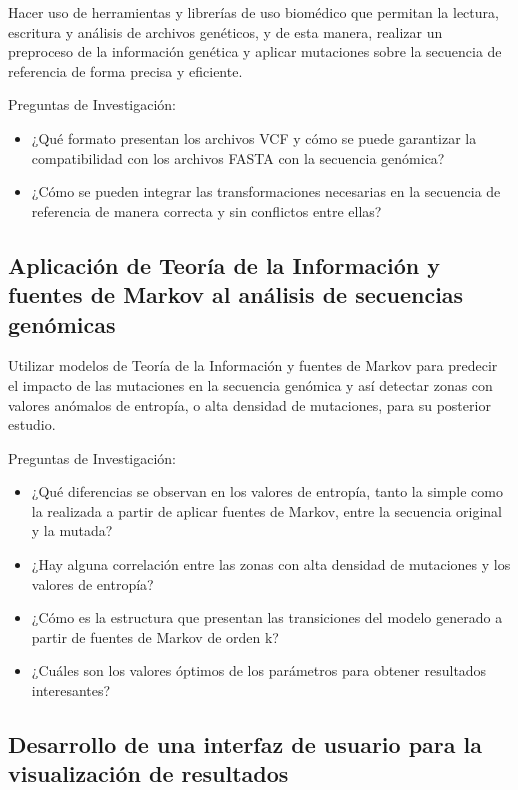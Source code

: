 \documentclass[11pt,spanish,listoffigures,listoftables]{tfgetsinf}
\begin{document}
Hacer uso de herramientas y librerías de uso biomédico que permitan la lectura, escritura y análisis de archivos genéticos, y de esta manera, realizar un preproceso de la información genética y aplicar mutaciones sobre la secuencia de referencia de forma precisa y eficiente.

Preguntas de Investigación: 
\begin{itemize}
\item ¿Qué formato presentan los archivos \acs{VCF} y cómo se puede garantizar la compatibilidad con los archivos \acs{FASTA} con la secuencia genómica?
\item ¿Cómo se pueden integrar las transformaciones necesarias en la secuencia de referencia de manera correcta y sin conflictos entre ellas?
\end{itemize}

\subsection{Aplicación de Teoría de la Información y fuentes de Markov al análisis de secuencias genómicas }

Utilizar modelos de Teoría de la Información y fuentes de Markov para predecir el impacto de las mutaciones en la secuencia genómica y así detectar zonas con valores anómalos de entropía, o alta densidad de mutaciones, para su posterior estudio. 

Preguntas de Investigación: 
\begin{itemize}
\item ¿Qué diferencias se observan en los valores de entropía, tanto la simple como la realizada a partir de aplicar fuentes de Markov, entre la secuencia original y la mutada? 
\item ¿Hay alguna correlación entre las zonas con alta densidad de mutaciones y los valores de entropía? 
\item ¿Cómo es la estructura que presentan las transiciones del modelo generado a partir de fuentes de Markov de orden k? 
\item ¿Cuáles son los valores óptimos de los parámetros para obtener resultados interesantes? 
\end{itemize}

\subsection{Desarrollo de una interfaz de usuario para la visualización de resultados }
\end{document}
